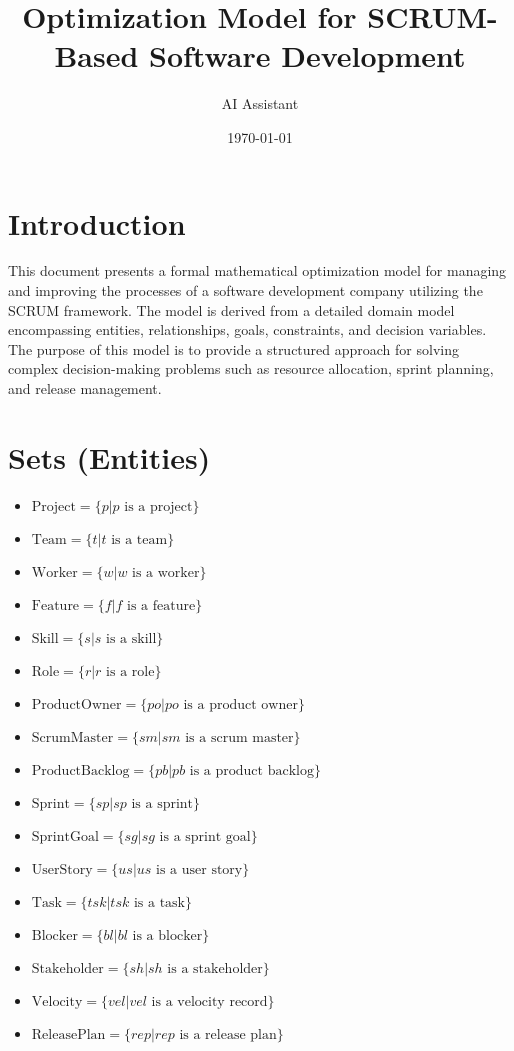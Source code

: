 \documentclass[11pt]{article}
\title{Optimization Model for SCRUM-Based Software Development}
\author{AI Assistant}
\date{\today}
\begin{document}
\maketitle
\tableofcontents
\newpage

\section*{Introduction}
This document presents a formal mathematical optimization model for managing and improving the processes of a software development company utilizing the SCRUM framework. The model is derived from a detailed domain model encompassing entities, relationships, goals, constraints, and decision variables. The purpose of this model is to provide a structured approach for solving complex decision-making problems such as resource allocation, sprint planning, and release management.

\section{Sets (Entities)}
\begin{itemize}
    \item $\text{Project} = \{p | p \text{ is a project}\}$
    \item $\text{Team} = \{t | t \text{ is a team}\}$
    \item $\text{Worker} = \{w | w \text{ is a worker}\}$
    \item $\text{Feature} = \{f | f \text{ is a feature}\}$
    \item $\text{Skill} = \{s | s \text{ is a skill}\}$
    \item $\text{Role} = \{r | r \text{ is a role}\}$
    \item $\text{ProductOwner} = \{po | po \text{ is a product owner}\}$
    \item $\text{ScrumMaster} = \{sm | sm \text{ is a scrum master}\}$
    \item $\text{ProductBacklog} = \{pb | pb \text{ is a product backlog}\}$
    \item $\text{Sprint} = \{sp | sp \text{ is a sprint}\}$
    \item $\text{SprintGoal} = \{sg | sg \text{ is a sprint goal}\}$
    \item $\text{UserStory} = \{us | us \text{ is a user story}\}$
    \item $\text{Task} = \{tsk | tsk \text{ is a task}\}$
    \item $\text{Blocker} = \{bl | bl \text{ is a blocker}\}$
    \item $\text{Stakeholder} = \{sh | sh \text{ is a stakeholder}\}$
    \item $\text{Velocity} = \{vel | vel \text{ is a velocity record}\}$
    \item $\text{ReleasePlan} = \{rep | rep \text{ is a release plan}\}$
\end{itemize}
\end{document}
